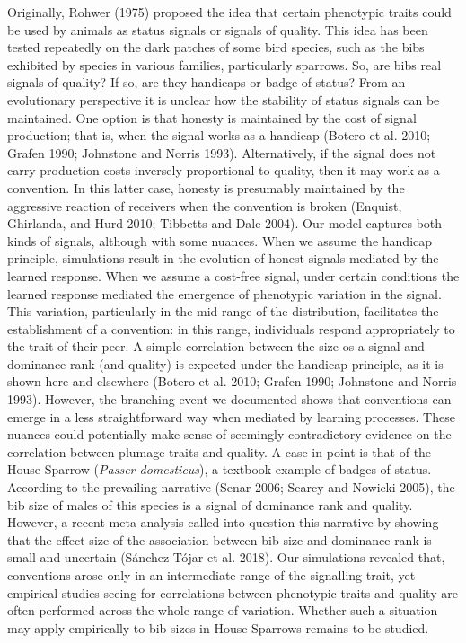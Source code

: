 \documentclass[
  12pt,
]{article}
\begin{document}
Originally, Rohwer (1975) proposed the idea that certain phenotypic
traits could be used by animals as status signals or signals of quality.
This idea has been tested repeatedly on the dark patches of some bird
species, such as the bibs exhibited by species in various families,
particularly sparrows. So, are bibs real signals of quality? If so, are
they handicaps or badge of status? From an evolutionary perspective it
is unclear how the stability of status signals can be maintained. One
option is that honesty is maintained by the cost of signal production;
that is, when the signal works as a handicap (Botero et al. 2010; Grafen
1990; Johnstone and Norris 1993). Alternatively, if the signal does not
carry production costs inversely proportional to quality, then it may
work as a convention. In this latter case, honesty is presumably
maintained by the aggressive reaction of receivers when the convention
is broken (Enquist, Ghirlanda, and Hurd 2010; Tibbetts and Dale 2004).
Our model captures both kinds of signals, although with some nuances.
When we assume the handicap principle, simulations result in the
evolution of honest signals mediated by the learned response. When we
assume a cost-free signal, under certain conditions the learned response
mediated the emergence of phenotypic variation in the signal. This
variation, particularly in the mid-range of the distribution,
facilitates the establishment of a convention: in this range,
individuals respond appropriately to the trait of their peer. A simple
correlation between the size os a signal and dominance rank (and
quality) is expected under the handicap principle, as it is shown here
and elsewhere (Botero et al. 2010; Grafen 1990; Johnstone and Norris
1993). However, the branching event we documented shows that conventions
can emerge in a less straightforward way when mediated by learning
processes. These nuances could potentially make sense of seemingly
contradictory evidence on the correlation between plumage traits and
quality. A case in point is that of the House Sparrow (\emph{Passer
domesticus}), a textbook example of badges of status. According to the
prevailing narrative (Senar 2006; Searcy and Nowicki 2005), the bib size
of males of this species is a signal of dominance rank and quality.
However, a recent meta-analysis called into question this narrative by
showing that the effect size of the association between bib size and
dominance rank is small and uncertain (Sánchez-Tójar et al. 2018). Our
simulations revealed that, conventions arose only in an intermediate
range of the signalling trait, yet empirical studies seeing for
correlations between phenotypic traits and quality are often performed
across the whole range of variation. Whether such a situation may apply
empirically to bib sizes in House Sparrows remains to be studied.
\end{document}
